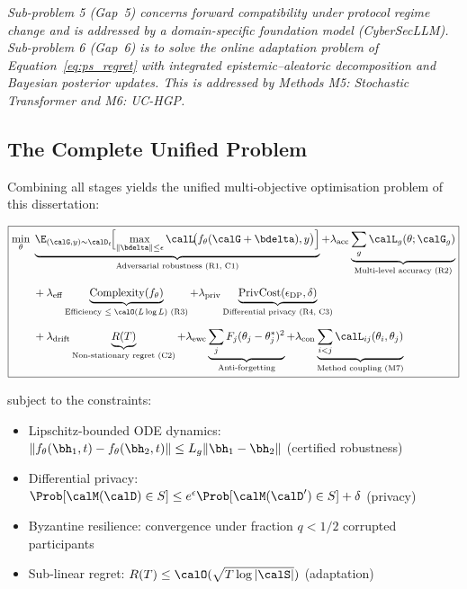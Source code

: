 \emph{Sub-problem 5 (Gap~5) concerns forward compatibility under protocol regime change and is addressed by a domain-specific foundation model (CyberSecLLM). Sub-problem 6 (Gap~6) is to solve the online adaptation problem of Equation~\eqref{eq:ps_regret} with integrated epistemic--aleatoric decomposition and Bayesian posterior updates. This is addressed by Methods M5: Stochastic Transformer and M6: UC-HGP.}


\subsection{The Complete Unified Problem}

Combining all stages yields the unified multi-objective optimisation problem of this dissertation:

\begin{equation}
\boxed{
\begin{aligned}
\min_\theta\;&
\underbrace{\E_{(\calG,y)\sim\calD_t}\!\Bigl[
  \max_{\|\bdelta\|\le\epsilon}
    \calL\!\bigl(f_\theta(\calG+\bdelta),y\bigr)
\Bigr]}_{\text{Adversarial robustness (R1, C1)}}
+ \lambda_{\mathrm{acc}}\underbrace{\sum_g\calL_g(\theta;\calG_g)}_{\text{Multi-level accuracy (R2)}}
\\[6pt]
&+ \lambda_{\mathrm{eff}}\underbrace{\mathrm{Complexity}(f_\theta)}_{\text{Efficiency $\le\calO(L\log L)$ (R3)}}
+ \lambda_{\mathrm{priv}}\underbrace{\mathrm{PrivCost}(\epsilon_{\mathrm{DP}},\delta)}_{\text{Differential privacy (R4, C3)}}
\\[6pt]
&+ \lambda_{\mathrm{drift}}\underbrace{R(T)}_{\text{Non-stationary regret (C2)}}
+ \lambda_{\mathrm{ewc}}\underbrace{\sum_j F_j(\theta_j-\theta_j^*)^2}_{\text{Anti-forgetting}}
+ \lambda_{\mathrm{con}}\underbrace{\sum_{i<j}\calL_{ij}(\theta_i,\theta_j)}_{\text{Method coupling (M7)}}
\end{aligned}
}
\label{eq:ps_unified}
\end{equation}

\noindent subject to the constraints:
\begin{itemize}
\item Lipschitz-bounded ODE dynamics: $\|f_\theta(\bh_1,t)-f_\theta(\bh_2,t)\|\le L_g\|\bh_1-\bh_2\|$ (certified robustness)
\item Differential privacy: $\Prob[\calM(\calD)\in S]\le e^{\epsilon}\Prob[\calM(\calD')\in S]+\delta$ (privacy)
\item Byzantine resilience: convergence under fraction $q<1/2$ corrupted participants
\item Sub-linear regret: $R(T)\le\calO(\sqrt{T\log|\calS|})$ (adaptation)
\end{itemize}

